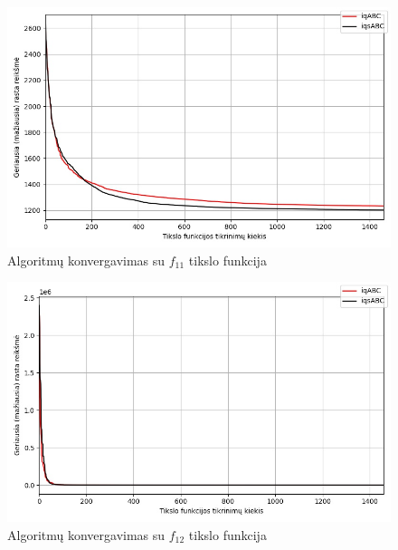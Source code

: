 \documentclass{VUMIFKompMagistrinis}
\begin{document}
\begin{landscape}
\begin{multicols}{2}
\begin{figure}[H]
    \centering
    \includegraphics[scale=0.5]{img/2kg/f11.jpg}
    \caption{Algoritmų konvergavimas su $f_{11}$ tikslo funkcija}
    \label{img:vkonf11}
\end{figure}

\begin{figure}[H]
    \centering
    \includegraphics[scale=0.5]{img/2kg/f12.jpg}
    \caption{Algoritmų konvergavimas su $f_{12}$ tikslo funkcija}
    \label{img:vkonf12}
\end{figure}






\end{multicols}
\begin{multicols}{2}


\end{multicols}
\end{landscape}
\end{document}
